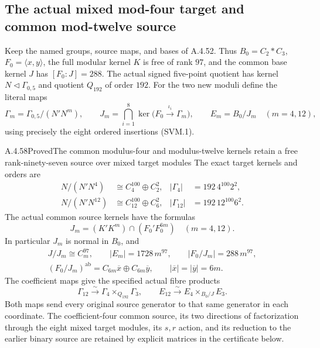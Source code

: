 \subsection{The actual mixed mod-four target and common mod-twelve source}

Keep the named groups, source maps, and bases of A.4.52.  Thus
$B_0=C_2*C_3$, $F_0=\langle x,y\rangle$, the full modular kernel
$K$ is free of rank $97$, and the common base kernel $J$ has
$[F_0:J]=288$.  The actual signed five-point quotient has kernel
$N\triangleleft\Gamma_{0,5}$ and quotient $Q_{192}$ of order $192$.
For the two new moduli define the literal maps
\[
 \Gamma_m=\Gamma_{0,5}/(N'N^m),\qquad
 J_m=\bigcap_{i=1}^8\ker\bigl(F_0\xrightarrow{\iota_i}\Gamma_m\bigr),
 \qquad E_m=B_0/J_m\quad(m=4,12),
                                                               \tag{CF4.1}
\]
using precisely the eight ordered insertions (SVM.1).

\begin{result}{A.4.58}{Proved}{The common modulus-four and modulus-twelve kernels retain a free rank-ninety-seven source over mixed target modules}
The exact target kernels and orders are
\[
 \begin{aligned}
 N/(N'N^4)&\cong C_4^{100}\oplus C_2^2,
 &|\Gamma_4|&=192\,4^{100}2^2,\\
 N/(N'N^{12})&\cong C_{12}^{100}\oplus C_6^2,
 &|\Gamma_{12}|&=192\,12^{100}6^2.
 \end{aligned}                                                   \tag{CF4.2}
\]
The actual common source kernels have the formulas
\[
                 J_m=(K'K^m)\cap(F_0'F_0^{6m})
                                     \quad(m=4,12).
                                                               \tag{CF4.3}
\]
In particular $J_m$ is normal in $B_0$, and
\[
 \begin{gathered}
 J/J_m\cong C_m^{97},\qquad |E_m|=1728\,m^{97},\qquad
 |F_0/J_m|=288\,m^{97},\\
 (F_0/J_m)^{\mathrm{ab}}=C_{6m}\overline x\oplus
 C_{6m}\overline y,\qquad |\overline x|=|\overline y|=6m.
 \end{gathered}                                                   \tag{CF4.4}
\]
The coefficient maps give the specified actual fibre products
\[
 \Gamma_{12}\xrightarrow{\sim}
        \Gamma_4\mathbin{\times}_{Q_{192}}\Gamma_3,
 \qquad
 E_{12}\xrightarrow{\sim}
        E_4\mathbin{\times}_{B_0/J}E_3.
                                                               \tag{CF4.5}
\]
Both maps send every original source generator to that same generator
in each coordinate.  The coefficient-four common source, its two
directions of factorization through the eight mixed target modules,
its $s,r$ action, and its reduction to the earlier binary source are
retained by explicit matrices in the certificate below.
\end{result}

